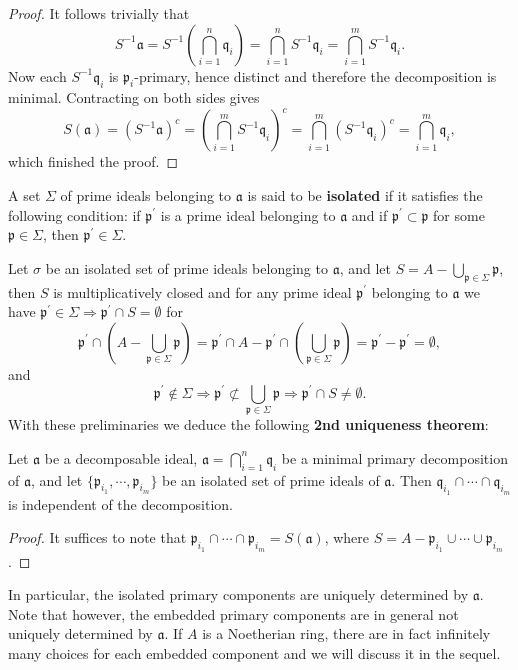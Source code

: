 \begin{proof}
It follows trivially that 
$$
S^{-1}\mathfrak{a} =S^{-1}\left( \bigcap_{i=1}^n{\mathfrak{q} _i} \right) =\bigcap_{i=1}^n{S^{-1}\mathfrak{q} _i}=\bigcap_{i=1}^m{S^{-1}\mathfrak{q} _i}.
$$
Now each $S^{-1}\mathfrak{q}_i$ is $\mathfrak{p}_i$-primary, hence distinct and therefore the decomposition is minimal. Contracting on both sides gives 
$$
S\left( \mathfrak{a} \right) =\left( S^{-1}\mathfrak{a} \right) ^c=\left( \bigcap_{i=1}^m{S^{-1}\mathfrak{q} _i} \right) ^c=\bigcap_{i=1}^m{\left( S^{-1}\mathfrak{q} _i \right) ^c}=\bigcap_{i=1}^m{\mathfrak{q} _i},
$$
which finished the proof.
\end{proof}
A set $\Sigma$ of prime ideals belonging to $\mathfrak{a}$ is said to be \textbf{isolated} if it satisfies the following condition: if $\mathfrak{p}^\prime$ is a prime ideal belonging to $\mathfrak{a}$ and if $\mathfrak{p}^\prime\subset\mathfrak{p}$ for some $\mathfrak{p}\in\Sigma$, then $\mathfrak{p}^\prime\in\Sigma$.\par
Let $\sigma$ be an isolated set of prime ideals belonging to $\mathfrak{a}$, and let $S=A-\bigcup_{\mathfrak{p}\in\Sigma}\mathfrak{p}$, then $S$ is multiplicatively closed and for any prime ideal $\mathfrak{p}^\prime$ belonging to $\mathfrak{a}$ we have $\mathfrak{p} ^{\prime}\in \Sigma \Longrightarrow \mathfrak{p} ^{\prime}\cap S=\emptyset $ for 
$$
\mathfrak{p} ^{\prime}\cap \left( A-\bigcup_{\mathfrak{p} \in \Sigma}{\mathfrak{p}} \right) =\mathfrak{p} ^{\prime}\cap A-\mathfrak{p} ^{\prime}\cap \left( \bigcup_{\mathfrak{p} \in \Sigma}{\mathfrak{p}} \right) =\mathfrak{p} ^{\prime}-\mathfrak{p} ^{\prime}=\emptyset ,
$$
and 
$$
\mathfrak{p} ^{\prime}\notin \Sigma \Longrightarrow \mathfrak{p} ^{\prime}\nsubset \bigcup_{\mathfrak{p} \in \Sigma}{\mathfrak{p}}\Longrightarrow \mathfrak{p} ^{\prime}\cap S\ne \emptyset .
$$
With these preliminaries we deduce the following \textbf{2nd uniqueness theorem}:
\begin{theorem}
Let $\mathfrak{a}$ be a decomposable ideal, $\mathfrak{a}=\bigcap_{i=1}^n\mathfrak{q}_i$ be a minimal primary decomposition of $\mathfrak{a}$, and let $\{\mathfrak{p}_{i_1},\cdots,\mathfrak{p}_{i_m}\}$ be an isolated set of prime ideals of $\mathfrak{a}$. Then $\mathfrak{q}_{i_1}\cap\cdots\cap\mathfrak{q}_{i_m}$ is independent of the decomposition.
\end{theorem}
\begin{proof}
It suffices to note that $\mathfrak{p} _{i_1}\cap \cdots \cap \mathfrak{p} _{i_m}=S\left( \mathfrak{a} \right) $, where $S=A-\mathfrak{p} _{i_1}\cup \cdots \cup \mathfrak{p} _{i_m}$.
\end{proof}
In particular, the isolated primary components are uniquely determined by $\mathfrak{a}$. Note that however, the embedded primary components are in general not uniquely determined by $\mathfrak{a}$. If $A$ is a Noetherian ring, there are in fact infinitely many choices for each embedded component and we will discuss it in the sequel.
